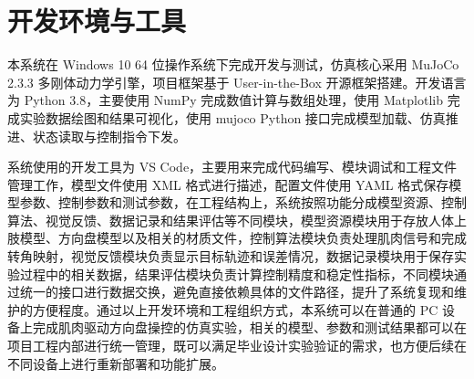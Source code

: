 \section{开发环境与工具}
本系统在 Windows 10 64 位操作系统下完成开发与测试，仿真核心采用 MuJoCo 2.3.3 多刚体动力学引擎，项目框架基于 User-in-the-Box 开源框架搭建。开发语言为 Python 3.8，主要使用 NumPy 完成数值计算与数组处理，使用 Matplotlib 完成实验数据绘图和结果可视化，使用 mujoco Python 接口完成模型加载、仿真推进、状态读取与控制指令下发。

系统使用的开发工具为 VS Code，主要用来完成代码编写、模块调试和工程文件管理工作，模型文件使用 XML 格式进行描述，配置文件使用 YAML 格式保存模型参数、控制参数和测试参数，在工程结构上，系统按照功能分成模型资源、控制算法、视觉反馈、数据记录和结果评估等不同模块，模型资源模块用于存放人体上肢模型、方向盘模型以及相关的材质文件，控制算法模块负责处理肌肉信号和完成转角映射，视觉反馈模块负责显示目标轨迹和误差情况，数据记录模块用于保存实验过程中的相关数据，结果评估模块负责计算控制精度和稳定性指标，不同模块通过统一的接口进行数据交换，避免直接依赖具体的文件路径，提升了系统复现和维护的方便程度。通过以上开发环境和工程组织方式，本系统可以在普通的 PC 设备上完成肌肉驱动方向盘操控的仿真实验，相关的模型、参数和测试结果都可以在项目工程内部进行统一管理，既可以满足毕业设计实验验证的需求，也方便后续在不同设备上进行重新部署和功能扩展。
